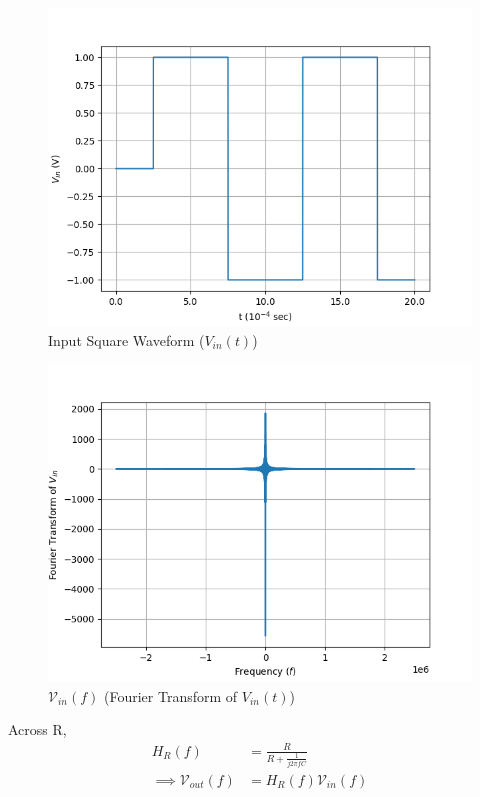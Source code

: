\documentclass[journal,12pt,twocolumn]{IEEEtran}
\theoremstyle{remark}
\begin{document}
\begin{figure}[!h]
    \centering
    \includegraphics[width = \columnwidth]{2023/PH/37/figs/square.png}
    \caption{Input Square Waveform ($V_{in}(t)$)}
    \label{fig:square_gate.ph.23.37}
\end{figure}
\begin{figure}[!h]
    \centering
    \includegraphics[width = \columnwidth]{2023/PH/37/figs/square_fourier.png}
    \caption{$\mathcal{V}_{in}(f)$ (Fourier Transform of $V_{in}(t)$)}
    \label{fig:square_fft_gate.ph.23.37}
\end{figure}
Across R,
\begin{align}
    H_{R}(f) &= \frac{R}{R + \frac{1}{j2\pi f C}}\\
    \implies \mathcal{V}_{out}(f) &= H_{R}(f)\mathcal{V}_{in}(f)
\end{align}
\end{document}
